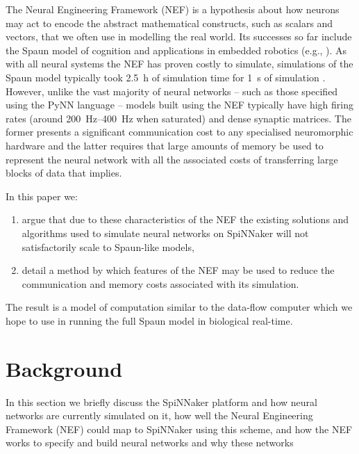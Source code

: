 \documentclass[conference]{IEEEtran}
\begin{document}
  The Neural Engineering Framework (NEF) \parencite{Eliasmith2004} is a
  hypothesis about how neurons may act to encode the abstract mathematical
  constructs, such as scalars and vectors, that we often use in modelling the
  real world.  Its successes so far include the Spaun model of cognition
  \parencite{Eliasmith2012} and applications in embedded robotics (e.g.,
  \parencite{Stewart2015ip}).  As with all neural systems the NEF has proven
  costly to simulate, simulations of the Spaun model typically took
  \SI{2.5}{\hour} of simulation time for \SI{1}{\second} of simulation
  \parencite[\S V]{Stewart2014}.  However, unlike the vast majority of neural
  networks -- such as those specified using the PyNN language
  \parencite{Davison2008} -- models built using the NEF typically have high
  firing rates (around \SIrange{200}{400}{\hertz} when saturated) and dense
  synaptic matrices.  The former presents a significant communication cost to
  any specialised neuromorphic hardware and the latter requires that large
  amounts of memory be used to represent the neural network with all the
  associated costs of transferring large blocks of data that implies.

  In this paper we:
  \begin{enumerate}
    \item argue that due to these characteristics of the NEF the
      existing solutions and algorithms used to simulate neural networks on
      SpiNNaker will not satisfactorily scale to Spaun-like models,

    \item detail a method by which features of the NEF may be used to reduce
      the communication and memory costs associated with its simulation.
      
  \end{enumerate}
  The result is a model of computation similar to the data-flow computer which
  we hope to use in running the full Spaun model in biological real-time.

  \section{Background}

  In this section we briefly discuss the SpiNNaker platform and how neural
  networks are currently simulated on it, how well the Neural Engineering
  Framework (NEF) could map to SpiNNaker using this scheme, and how the NEF
  works to specify and build neural networks and why these networks
\end{document}
